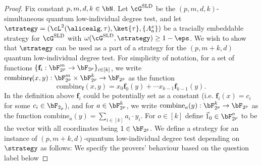 \newcommand{\combinefun}{\text{combine}}
\begin{proof}

	Fix constant $p, m ,d, k \in \bN$. Let $\cG^{\text{SLD}}$ be the $(p,m,d,k)$-simultaneous quantum low-individual degree test, and let $\strategy = (\cL^2(\alicealg, \tau), \ket{\tau}, \{A_a^x \})$ be a tracially embeddable strategy for $\cG^{\text{SLD}}$ with $\omega(\cG^{\text{SLD}}, \strategy) \geq 1 - \eps$. We wish to show that $\strategy$ can be used as a part of a strategy for the $(p,m+k,d)$ quantum low-individual degree test. For simplicity of notation, for a set of functions $\{\textbf{f}_i: \bF_{2^p}^m \rightarrow \bF_{2^p}\}_{i \in [k]}$,  we write $\combinefun_{\textbf{f}}(x,y): \bF_{2^p}^m \times \bF_{2^p}^k \rightarrow  \bF_{2^p}$ as the function 
	\begin{equation}
		\combinefun_{\textbf{f}} (x,y) = x_0 \textbf{f}_0(y) + \cdots  x_{k-1} \textbf{f}_{k-1}(y).
	\end{equation}
	In the definition above $\textbf{f}_i$ could be potentially set as a constant (i.e. $\textbf{f}_i (x) = c_i$ for some $c_i \in \bF_{2_p}$), and for $a \in \bF_{2^p}^k$, we write $\combinefun_{a} (y): \bF_{2^p}^k \rightarrow  \bF_{2^p}$ as the function $\combinefun_{a} (y) = \sum_{i \in [k]} a_i \cdot y_i$. For $o \in [k]$ define $\vec{1}_0 \in \bF_{2^p}^o$ to be the vector with all coordinates being $1 \in  \bF_{2^p}$. We define a strategy for an instance of $(p,m+k,d)$-quantum low-individual degree test depending on $\strategy$ as follows: We specify the provers' behaviour based on the question label below

\end{proof}
